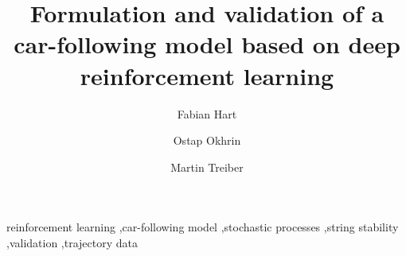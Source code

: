 \documentclass[review]{elsarticle}
\providecommand{\martinc}[1]{}                  %
\providecommand{\3}{{\ss}}
\begin{document}
	
	\begin{frontmatter}
		
		\title{Formulation and validation of a car-following model based on deep
			reinforcement learning}
		
		
		\author[firstAddress]{Fabian Hart}
		\author[firstAddress,secondAddress]{Ostap Okhrin}
		\author[firstAddress,secondAddress]{Martin Treiber}
		
		\address[firstAddress]{TU Dresden}
		\address[secondAddress]{Possible second address}
		
		
		
		
		\begin{abstract}
			\martinc{After the final research has settled, I can write it}
		\end{abstract}
		
		\begin{keyword}
			reinforcement learning \sep car-following model \sep stochastic
			processes \sep string stability \sep validation \sep trajectory data 
		\end{keyword}
		
	\end{frontmatter}
	
	
\end{document}
